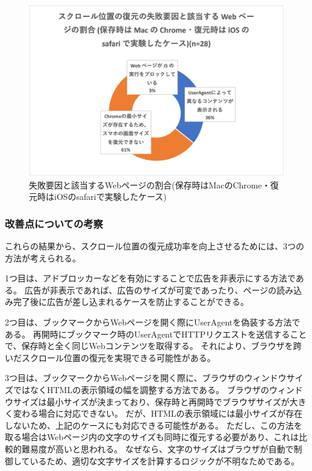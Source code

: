 \begin{figure}[htbp]
  \label{fig:evl-consideration-scroll-position-cause-ratio-multi-device}
  \begin{center}
    \includegraphics[bb=0 0 452.22222222 303.33333333,width=15cm]{img/060_evaluation/consideration/scroll_position/cause-ratio-multi-device.pdf}
  \end{center}
  \caption{失敗要因と該当するWebページの割合(保存時はMacのChrome・復元時はiOSのsafariで実験したケース)}
\end{figure}

\subsubsection{改善点についての考察}
これらの結果から、スクロール位置の復元成功率を向上させるためには、3つの方法が考えられる。

1つ目は、アドブロッカーなどを有効にすることで広告を非表示にする方法である。
広告が非表示であれば、広告のサイズが可変であったり、ページの読み込み完了後に広告が差し込まれるケースを防止することができる。

2つ目は、ブックマークからWebページを開く際にUserAgentを偽装する方法である。
再開時にブックマーク時のUserAgentでHTTPリクエストを送信することで、保存時と全く同じWebコンテンツを取得する。
それにより、ブラウザを跨いだスクロール位置の復元を実現できる可能性がある。

3つ目は、ブックマークからWebページを開く際に、ブラウザのウィンドウサイズではなくHTMLの表示領域の幅を調整する方法である。
ブラウザのウィンドウサイズは最小サイズが決まっており、保存時と再開時でブラウザサイズが大きく変わる場合に対応できない。
だが、HTMLの表示領域には最小サイズが存在しないため、上記のケースにも対応できる可能性がある。
ただし、この方法を取る場合はWebページ内の文字のサイズも同時に復元する必要があり、これは比較的難易度が高いと思われる。
なぜなら、文字のサイズはブラウザが自動で制御しているため、適切な文字サイズを計算するロジックが不明なためである。

